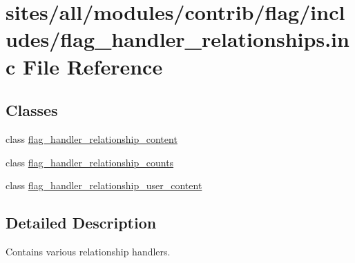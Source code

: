 \hypertarget{flag__handler__relationships_8inc}{
\section{sites/all/modules/contrib/flag/includes/flag\_\-handler\_\-relationships.inc File Reference}
\label{flag__handler__relationships_8inc}
}
\subsection*{Classes}
\begin{CompactItemize}
\item 
class \hyperlink{classflag__handler__relationship__content}{flag\_\-handler\_\-relationship\_\-content}
\item 
class \hyperlink{classflag__handler__relationship__counts}{flag\_\-handler\_\-relationship\_\-counts}
\item 
class \hyperlink{classflag__handler__relationship__user__content}{flag\_\-handler\_\-relationship\_\-user\_\-content}
\end{CompactItemize}


\subsection{Detailed Description}
Contains various relationship handlers. 
